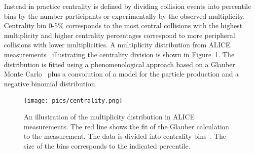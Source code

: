 
Instead in practice centrality is defined by dividing collision events into percentile bins by the number participants or experimentally by the observed multiplicity. Centrality bin 0-5\% corresponds to the most central collisions with the highest multiplicity and higher centrality percentages correspond to more peripheral collisions with lower multiplicities. A multiplicity distribution from ALICE measurements~\cite{PhysRevC.88.044909} illustrating the centrality division is shown in Figure~\ref{fig:centrality}. The distribution is fitted using a phenomenological approach based on a Glauber Monte Carlo~\cite{Miller:2007ri} plus a convolution of a model for the particle production and a negative binomial distribution. 


\begin{figure}[tb]
\centering

               \texttt{[image: pics/centrality.png]}
        \caption[An illustration of the multiplicity distribution in ALICE measurement with centrality classes.]{An illustration of the multiplicity distribution in ALICE measurements. The red line shows
the fit of the Glauber calculation to the measurement. The data is divided into centrality bins~\cite{PhysRevC.88.044909}. The size of the bins corresponds to the indicated percentile.}
        	\label{fig:centrality}
\end{figure}

